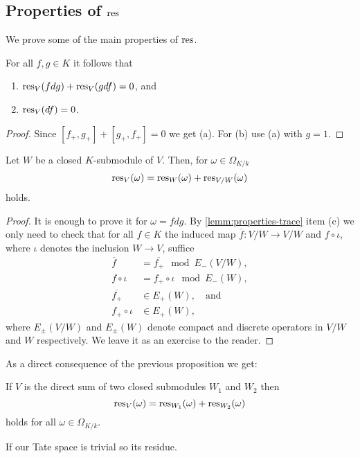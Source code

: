 \subsection*{Properties of $\operatorname{res}$}
We prove some of the main properties of $\operatorname{res}$.
\begin{proposition}\label{prop:linearity-residue}
	For all $f,g \in K$ it follows that
	\begin{enumerate}[label = (\alph*)]
		\item $\operatorname{res}_{V}(fdg) + \operatorname{res}_{V}(gdf) = 0$, and
		\item $\operatorname{res}_V(df) = 0$.
	\end{enumerate}
\end{proposition}
\begin{proof}
	Since $[f_{+}, g_{+}] + [g_{+}, f_{+}] = 0$ we get (a). For (b) use (a) with $g = 1$. 
\end{proof}
\begin{proposition}\label{prop:linearity-residue-closed-submodule}
	Let $W$ be a closed $K$-submodule of $V$. Then, for $\omega \in \Omega_{K/k}$
	\[
		\operatorname{res}_{V}(\omega) = \operatorname{res}_{W}(\omega) + \operatorname{res}_{V/W}(\omega)
	\]
	holds.
\end{proposition}
\begin{proof}
	It is enough to prove it for $\omega = f dg$. By \cref{lemm:properties-trace} item (c) we only need to check that for all $f \in K$ the induced map $\overline{f}\colon V/W \to V/W$ and $f \circ \iota$, where $\iota$ denotes the inclusion $W \to V$, suffice 
	\begin{align*}
	\overline{f} &= \overline{f_{+}} \mod E_{-}(V/W), \\
	f \circ \iota &= f_{+} \circ \iota \mod E_{-}(W), \\ 
	\overline{f_{+}}&\in E_{+}(W), \quad\text{and} \\
	f_{+} \circ \iota &\in E_{+}(W),
	\end{align*}
	where $E_{\pm}(V/W)$ and $E_{\pm}(W)$ denote compact and discrete operators in $V/W$ and $W$ respectively. We leave it as an exercise to the reader.
\end{proof}
As a direct consequence of the previous proposition we get:
\begin{proposition}\label{prop:direct-sum-residue}
	If $V$ is the direct sum of two closed submodules $W_{1}$ and $W_{2}$ then 
	\[
		\operatorname{res}_{V}(\omega) = \operatorname{res}_{W_{1}}(\omega) + \operatorname{res}_{W_{2}}(\omega)
	\]
	holds for all $\omega \in \Omega_{K/k}$.
\end{proposition}
If our Tate space is trivial so its residue.
